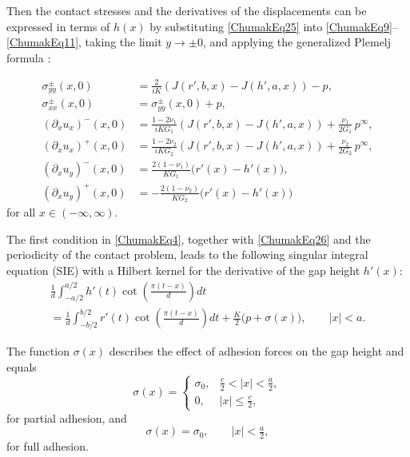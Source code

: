 Then the contact stresses and the derivatives of the displacements can be expressed in terms of $h(x)$ by substituting \eqref{ChumakEq25} into \eqref{ChumakEq9}–\eqref{ChumakEq11}, taking the limit $y \to \pm 0$, and applying the generalized Plemelj formula \cite{Chumak5}:

\begin{align}
	\label{ChumakEq26}
	\sigma_{yy}^{\pm}(x,0)
	&=
	\frac{2}{iK}
	\left(
	J(r',b,x) - J(h',a,x)
	\right)
	- p,
	\\
	\label{ChumakEq27}
	\sigma_{xx}^{\pm}(x,0)
	&=
	\sigma_{yy}^{\pm}(x,0) + p,
	\\
	\label{ChumakEq28}
	\left(\partial_x u_x\right)^{-}(x,0)
	&=
	\frac{1 - 2\nu_{1}}{iK G_{1}}
	\left(
	J(r',b,x) - J(h',a,x)
	\right)
	+
	\frac{\nu_{1}}{2G_{1}}\, p^{\infty},
	\\
	\label{ChumakEq29}
	\left(\partial_x u_x\right)^{+}(x,0)
	&=
	\frac{1 - 2\nu_{2}}{iK G_{2}}
	\left(
	J(r',b,x) - J(h',a,x)
	\right)
	+
	\frac{\nu_{2}}{2G_{2}}\, p^{\infty},
	\\
	\label{ChumakEq30}
	\left(\partial_x u_y\right)^{-}(x,0)
	&=
	\frac{2(1 - \nu_{1})}{K G_{1}}
	\bigl(
	r'(x) - h'(x)
	\bigr),
	\\
	\label{ChumakEq31}
	\left(\partial_x u_y\right)^{+}(x,0)
	&=
	-
	\frac{2(1 - \nu_{2})}{K G_{2}}
	\bigl(
	r'(x) - h'(x)
	\bigr)
\end{align}
%
for all $x \in (-\infty,\infty)$.

The first condition in \eqref{ChumakEq4}, together with \eqref{ChumakEq26} and the periodicity of the contact problem, leads to the following singular integral equation (SIE) with a Hilbert kernel for the derivative of the gap height $h'(x)$:
\begin{multline}
	\label{ChumakEq32}
	\frac{1}{d}
	\int_{-a/2}^{a/2}
	h'(t)
	\cot\!\left(
	\frac{\pi (t-x)}{d}
	\right)
	dt
	\\
	=
	\frac{1}{d}
	\int_{-b/2}^{b/2}
	r'(t)
	\cot\!\left(
	\frac{\pi (t-x)}{d}
	\right)
	dt
	+
	\frac{K}{2}\bigl(p + \sigma(x)\bigr),
	\qquad |x| < a.
\end{multline}



The function $\sigma(x)$ describes the effect of adhesion forces on the gap height and equals
\begin{equation}
	\label{ChumakEq33}
	\sigma(x)=
	\begin{cases}
		\sigma_{0}, & \tfrac{c}{2} < |x| < \tfrac{a}{2}, \\
		0,          & |x| \le \tfrac{c}{2},
	\end{cases}
\end{equation}
for partial adhesion, and
\begin{equation}
	\label{ChumakEq34}
	\sigma(x)=\sigma_{0},
	\qquad |x| < \tfrac{a}{2},
\end{equation}
for full adhesion.

